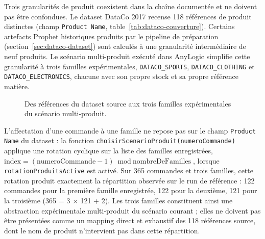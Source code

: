 \documentclass[11pt,a4paper]{article}
\newcommand{\code}[1]{\texttt{#1}}
\begin{document}
Trois granularités de produit coexistent dans la chaîne documentée et ne doivent pas être confondues. Le dataset DataCo 2017 recense 118 références de produit distinctes (champ \code{Product Name}, table~\ref{tab:dataco-couverture}). Certains artefacts Prophet historiques produits par le pipeline de préparation (section~\ref{sec:dataco-dataset}) sont calculés à une granularité intermédiaire de neuf produits. Le scénario multi-produit exécuté dans AnyLogic simplifie cette granularité à trois familles expérimentales, \code{DATACO\_SPORTS}, \code{DATACO\_CLOTHING} et \code{DATACO\_ELECTRONICS}, chacune avec son propre stock et sa propre référence matière.

\begin{figure}[htbp]
\centering
{}
\caption{Des références du dataset source aux trois familles expérimentales du scénario multi-produit.}
\label{fig:familles-granularite}
\end{figure}

L'affectation d'une commande à une famille ne repose pas sur le champ \code{Product Name} du dataset : la fonction \code{choisirScenarioProduit(numeroCommande)} applique une rotation cyclique sur la liste des familles enregistrées, \(\text{index} = (\text{numeroCommande} - 1) \bmod \text{nombreDeFamilles}\), lorsque \code{rotationProduitsActive} est activé. Sur 365 commandes et trois familles, cette rotation produit exactement la répartition observée sur le run de référence : 122 commandes pour la première famille enregistrée, 122 pour la deuxième, 121 pour la troisième (365 = 3 $\times$ 121 + 2). Les trois familles constituent ainsi une abstraction expérimentale multi-produit du scénario courant ; elles ne doivent pas être présentées comme un mapping direct et exhaustif des 118 références source, dont le nom de produit n'intervient pas dans cette répartition.
\end{document}
